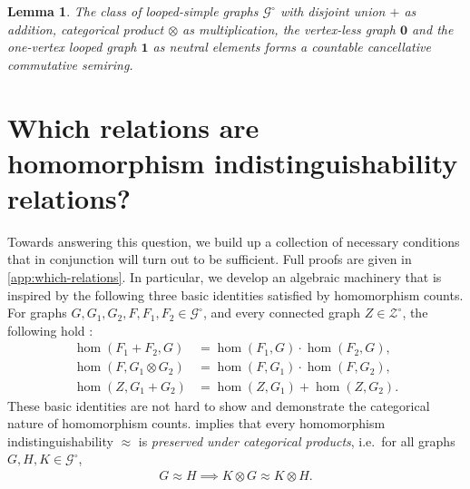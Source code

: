 \documentclass[11pt]{scrartcl}
\theoremstyle{definition}
\theoremstyle{plain}
\newtheorem{lemma}[definition]{Lemma}
\theoremstyle{remark}
\newcommand{\lG}{\mathcal{G}^\circ}
\newcommand{\lZ}{\mathcal{Z}^\circ}
\begin{document}
	\begin{lemma}\label{lem:graphs-form-semiring}
		The class of looped-simple graphs $\lG$ with disjoint union $+$ as addition, categorical product $\otimes$ as multiplication, the vertex-less graph $\boldsymbol{0}$ and the one-vertex looped graph $\boldsymbol{1}$ as neutral elements forms a countable cancellative commutative semiring.
	\end{lemma}

	\section{Which relations are homomorphism indistinguishability relations?}
	\label{sec:which-relations}


	Towards answering this question, 
	we build up a collection of necessary conditions that in conjunction will turn out to be sufficient.
	Full proofs are given in \cref{app:which-relations}.
	In particular, 
	we develop an algebraic machinery that is inspired by the following three basic identities 
	satisfied by homomorphism counts.
	For graphs $G, G_1, G_2, F, F_1, F_2 \in \lG$, and every connected graph $Z \in \lZ$, the following hold
	\cite[(5.28)--(5.30)]{lovasz_large_2012}:
	\begin{align}
		\hom(F_1 + F_2, G) & = \hom(F_1, G) \cdot \hom(F_2, G)\label{eq:coprod},\\
		\hom(F, G_1 \otimes G_2) &= \hom(F, G_1) \cdot \hom(F, G_2) \label{eq:prod}, \\
		\hom(Z, G_1 + G_2) &= \hom(Z, G_1) + \hom(Z, G_2).\label{eq:connected} 
	\end{align}
	These basic identities are not hard to show and demonstrate the categorical nature of homomorphism counts.
	 implies that every homomorphism indistinguishability $\approx$ is \emph{preserved under categorical products}, i.e.\
	for all graphs $G, H, K \in \lG$,
	\begin{align}
		\label{eq:h1}
		G \approx H \implies K \otimes G \approx K \otimes H.
	\end{align}
	
\end{document}
